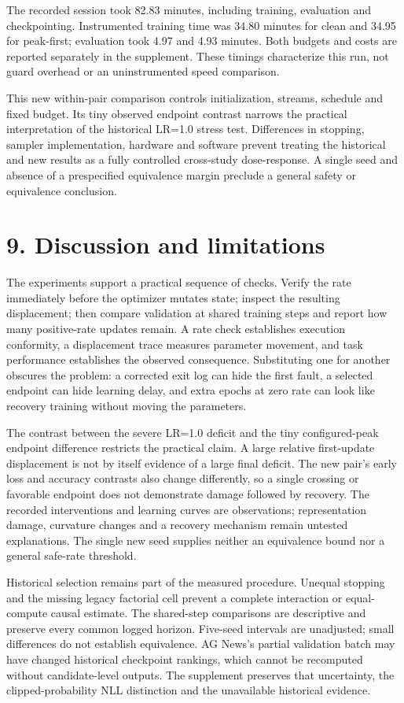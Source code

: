 \documentclass[smallextended]{svjour3}
\begin{document}
The recorded session took 82.83 minutes, including training, evaluation and checkpointing. Instrumented training time was 34.80 minutes for clean and 34.95 for peak-first; evaluation took 4.97 and 4.93 minutes. Both budgets and costs are reported separately in the supplement. These timings characterize this run, not guard overhead or an uninstrumented speed comparison.

This new within-pair comparison controls initialization, streams, schedule and fixed budget. Its tiny observed endpoint contrast narrows the practical interpretation of the historical LR=1.0 stress test. Differences in stopping, sampler implementation, hardware and software prevent treating the historical and new results as a fully controlled cross-study dose-response. A single seed and absence of a prespecified equivalence margin preclude a general safety or equivalence conclusion.

\section{9. Discussion and limitations}\label{discussion-and-limitations}

The experiments support a practical sequence of checks. Verify the rate immediately before the optimizer mutates state; inspect the resulting displacement; then compare validation at shared training steps and report how many positive-rate updates remain. A rate check establishes execution conformity, a displacement trace measures parameter movement, and task performance establishes the observed consequence. Substituting one for another obscures the problem: a corrected exit log can hide the first fault, a selected endpoint can hide learning delay, and extra epochs at zero rate can look like recovery training without moving the parameters.

The contrast between the severe LR=1.0 deficit and the tiny configured-peak endpoint difference restricts the practical claim. A large relative first-update displacement is not by itself evidence of a large final deficit. The new pair's early loss and accuracy contrasts also change differently, so a single crossing or favorable endpoint does not demonstrate damage followed by recovery. The recorded interventions and learning curves are observations; representation damage, curvature changes and a recovery mechanism remain untested explanations. The single new seed supplies neither an equivalence bound nor a general safe-rate threshold.

Historical selection remains part of the measured procedure. Unequal stopping and the missing legacy factorial cell prevent a complete interaction or equal-compute causal estimate. The shared-step comparisons are descriptive and preserve every common logged horizon. Five-seed intervals are unadjusted; small differences do not establish equivalence. AG News's partial validation batch may have changed historical checkpoint rankings, which cannot be recomputed without candidate-level outputs. The supplement preserves that uncertainty, the clipped-probability NLL distinction and the unavailable historical evidence.
\end{document}
